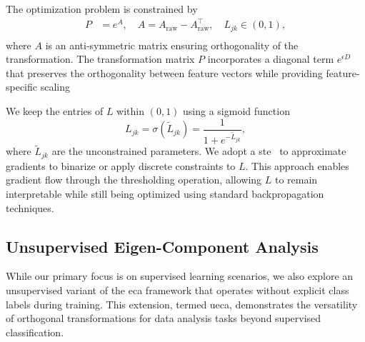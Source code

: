 \documentclass[lettersize,journal]{IEEEtran}
\begin{document}
The optimization problem is constrained by
\begin{equation}
\begin{aligned}
P &= e^{A}, \quad A = A_{\text{raw}} - A_{\text{raw}}^\top, \quad L_{jk} \in (0,1),\\
\end{aligned}
\end{equation}
where $A$ is an anti-symmetric matrix ensuring orthogonality of the transformation. The transformation matrix $P$ incorporates a diagonal term $e^{\epsilon D}$ that preserves the orthogonality between feature vectors while providing feature-specific scaling~\cite{hu2020brief}%

We keep the entries of \( L \) within \( (0,1) \) using a sigmoid function
\begin{equation}
L_{jk} = \sigma(\tilde{L}_{jk}) = \frac{1}{1 + e^{-\tilde{L}_{jk}}},
\end{equation}
where \( \tilde{L}_{jk} \) are the unconstrained parameters.
We adopt a \Gls{ste}~\cite{bengio2013estimating} to approximate gradients to binarize or apply discrete constraints to \(L\). This approach enables gradient flow through the thresholding operation, allowing \(L\) to remain interpretable while still being optimized using standard backpropagation techniques.

\subsection{Unsupervised Eigen-Component Analysis}

While our primary focus is on supervised learning scenarios, we also explore an unsupervised variant of the \gls{eca} framework that operates without explicit class labels during training. This extension, termed \gls{ueca}, demonstrates the versatility of orthogonal transformations for data analysis tasks beyond supervised classification.
\end{document}
